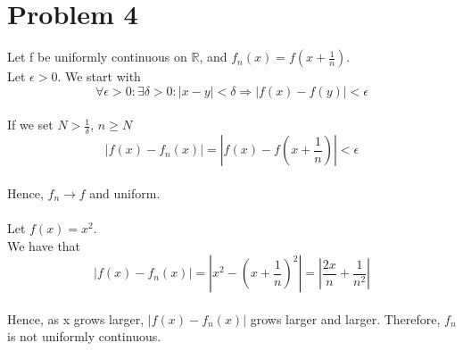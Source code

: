 \documentclass{article}
\begin{document}
\section*{Problem 4}
Let f be uniformly continuous on $\mathbb{R}$, and $f_n(x) = f(x + \frac{1}{n})$.
\\Let $\epsilon > 0$. We start with $$\forall \epsilon > 0 : \exists \delta > 0 : |x - y| < \delta \Rightarrow |f(x) - f(y)| < \epsilon$$
\\If we set $N > \frac{1}{\delta}$,  $n \geq N$
$$|f(x) - f_n(x)| = |f(x) - f(x + \frac{1}{n})| < \epsilon$$
\\Hence, $f_n \to f$ and uniform.
\\
\\Let $f(x) = x^2$.
\\We have that $$|f(x) - f_n(x)| = |x^2 - (x + \frac{1}{n})^2| = |\frac{2x}{n} + \frac{1}{n^2}|$$
\\Hence, as x grows larger, $|f(x)-f_n(x)|$ grows larger and larger. Therefore, $f_n$ is not uniformly continuous.
\end{document}
